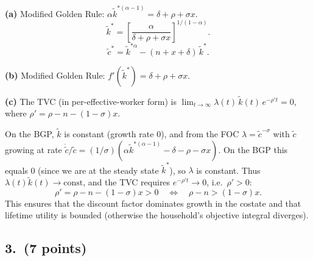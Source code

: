 \documentclass[a4paper,11pt]{article}
\newcommand{\ktilde}{\tilde{k}}
\newcommand{\ctilde}{\tilde{c}}
\begin{document}
\begin{answerbox}
\textbf{(a)} Modified Golden Rule: $\alpha\ktilde^{*(\alpha-1)} = \delta + \rho + \sigma x$.
\[
    \boxed{\ktilde^* = \left[\frac{\alpha}{\delta + \rho + \sigma x}
    \right]^{1/(1-\alpha)}.}
\]
\[
    \ctilde^* = \ktilde^{*\alpha} - (n+x+\delta)\,\ktilde^*.
\]

\textbf{(b)} Modified Golden Rule: $f'(\ktilde^*) = \delta + \rho + \sigma x$.

\textbf{(c)} The TVC (in per-effective-worker form) is
$\lim_{t\to\infty}\lambda(t)\,\ktilde(t)\,e^{-\rho'\!t} = 0$,
where $\rho' = \rho - n - (1-\sigma)x$.

On the BGP, $\ktilde$ is constant (growth rate 0), and from the FOC $\lambda = \ctilde^{-\sigma}$
with $\ctilde$ growing at rate $\dot{\ctilde}/\ctilde = (1/\sigma)(\alpha\ktilde^{*(\alpha-1)}-\delta-\rho-\sigma x)$.
On the BGP this equals 0 (since we are at the steady state $\ktilde^*$), so $\lambda$ is
constant.  Thus $\lambda(t)\ktilde(t) \to \text{const}$, and the TVC requires
$e^{-\rho' t}\to 0$, i.e.\ $\rho' > 0$:
\[
    \rho' = \rho - n - (1-\sigma)x > 0
    \quad\Longleftrightarrow\quad
    \rho - n > (1-\sigma)x.
\]
This ensures that the discount factor dominates growth in the costate and that lifetime
utility is bounded (otherwise the household's objective integral diverges).
\end{answerbox}

\subsection*{3.\ (7 points)}
\end{document}
